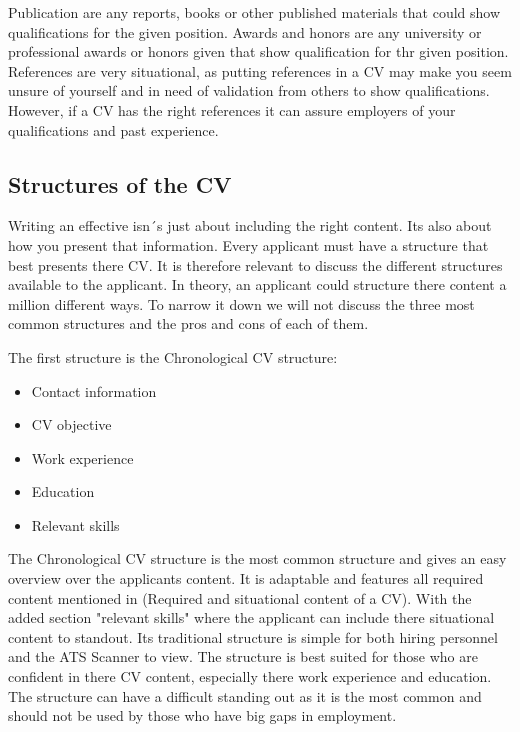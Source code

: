 Publication are any reports, books or other published materials that could show qualifications for the given position.
Awards and honors are any university or professional awards or honors given that show qualification for thr given position.
References are very situational, as putting references in a CV may make you seem unsure of yourself and in need of validation from others to show qualifications.
However, if a CV has the right references it can assure employers of your qualifications and past experience.\\

\subsection{Structures of the CV}
Writing an effective isn´s just about including the right content. 
Its also about how you present that information.
Every applicant must have a structure that best presents there CV.
It is therefore relevant to discuss the different structures available to the applicant. 
In theory, an applicant could structure there content a million different ways.
To narrow it down we will not discuss the three most common structures and the pros and cons of each of them.

The first structure is the Chronological CV structure: \\
\begin{itemize}
   \item  Contact information
   \item  CV objective
   \item  Work experience
   \item  Education
   \item  Relevant skills
   \end{itemize}
The Chronological CV structure is the most common structure and gives an easy overview over the applicants content.
It is adaptable and features all required content mentioned in (Required and situational content of a CV).
With the added section "relevant skills" where the applicant can include there situational content to standout.
Its traditional structure is simple for both hiring personnel and the ATS Scanner to view.
The structure is best suited for those who are confident in there CV content, especially there work experience and education.
The structure can have a difficult standing out as it is the most common and should not be used by those who have big gaps in employment.\\


